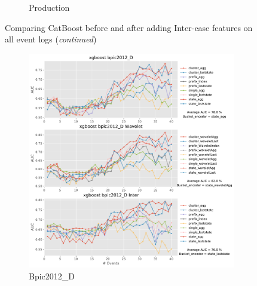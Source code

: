 \documentclass[twoside,11pt]{Latex/Classes/PhDthesisPSnPDF}
\begin{document}
\begin{figure}[!htbp]
\begin{subfigure}{0.48\textwidth}
		\caption{Production} \label{fig:proi}
	\end{subfigure}\hspace*{\fill}
\caption{Comparing CatBoost before and after adding Inter-case features on all event logs (\textit{continued})}
\label{fig:interc3}
\end{figure}





\begin{figure}[!htbp] %
	
	\begin{subfigure}{0.48\textwidth}
		\includegraphics[width=\linewidth]{images/inter/xgboost/bpic2012_D.pdf}
		\caption{Bpic2012\_D} \label{fig:b12di}
	\end{subfigure}\hspace*{\fill}
	\begin{subfigure}{0.48\textwidth}

\end{subfigure}
\end{figure}
\end{document}
